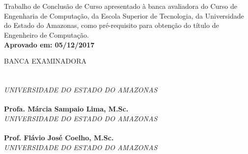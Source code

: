 
\begin{center}
\bf \MakeUppercase{\nome}\\[1.5 cm]
\end{center}

\begin{center}
\bf \MakeUppercase{\titulo}\\[1.5cm]
\end{center}

\hspace*{8cm}
\begin{minipage}{8cm}

Trabalho de Conclusão de Curso apresentado à
banca avaliadora do Curso de Engenharia de Computação,
da Escola Superior de Tecnologia, da Universidade do Estado do Amazonas,
como pré-requisito para obtenção do título de
Engenheiro de Computação.\\

\large \bf Aprovado em: 05/12/2017
\end{minipage}

BANCA EXAMINADORA\\[12 pt]

\noindent \hrulefill \hspace*{6cm} \\
\noindent \textbf{\orientador}\\
\textit{UNIVERSIDADE DO ESTADO DO AMAZONAS}\\[0.5cm]

\noindent \hrulefill \hspace*{6cm} \\
\noindent \textbf{Profa. Márcia Sampaio Lima, M.Sc.}\\
\textit{UNIVERSIDADE DO ESTADO DO AMAZONAS}\\[0.5cm]

\noindent \hrulefill \hspace*{6cm} \\
\noindent \textbf{Prof. Flávio José Coelho, M.Sc.}\\
\textit{UNIVERSIDADE DO ESTADO DO AMAZONAS}\\
